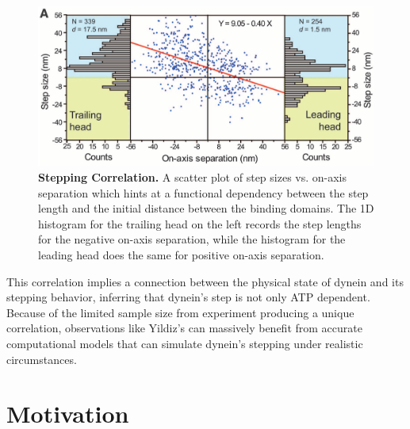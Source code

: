 \begin{figure}[H]
	\centering
	\includegraphics[width=1\columnwidth]{Figures/Yildiz_stepping.png}
	\caption[Stepping Correlation]{\textbf{Stepping Correlation.} A scatter plot of step sizes vs. on-axis separation which hints at a functional dependency between the step  length and the initial distance between the binding domains. The 1D histogram for the trailing head on the left records the step lengths for the negative on-axis separation, while the histogram for the leading head does the same for positive on-axis separation. \cite{Dewitt2012} }
	\label{fig:YildizCorrelation}
\end{figure}

This correlation implies a connection between the physical state of dynein and its stepping behavior, inferring that dynein's step is not only ATP dependent. Because of the limited sample size from experiment producing a unique correlation, observations like Yildiz's can massively benefit from accurate computational models that can simulate dynein's stepping under realistic circumstances.




\section{Motivation}

